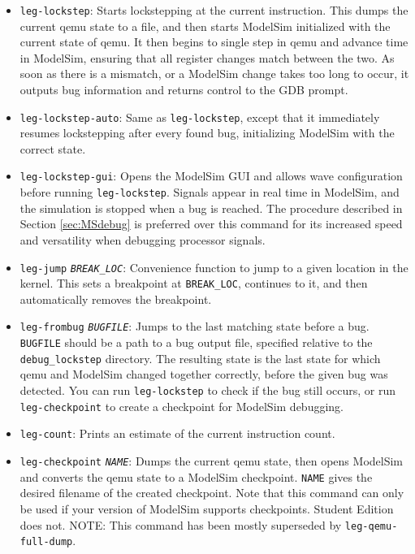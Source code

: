 \begin{itemize}
\item \texttt{leg-lockstep}: Starts lockstepping at the current instruction. This dumps the current qemu state to a file, and then starts ModelSim initialized with the current state of qemu. It then begins to single step in qemu and advance time in ModelSim, ensuring that all register changes match between the two. As soon as there is a mismatch, or a ModelSim change takes too long to occur, it outputs bug information and returns control to the GDB prompt.

\item \texttt{leg-lockstep-auto}: Same as \texttt{leg-lockstep}, except that it immediately resumes lockstepping after every found bug, initializing ModelSim with the correct state.

\item \texttt{leg-lockstep-gui}: Opens the ModelSim GUI and allows wave configuration before running \texttt{leg-lockstep}.
Signals appear in real time in ModelSim, and the simulation is stopped when a bug is reached. 
The procedure described in Section \ref{sec:MSdebug} is preferred over this command for its increased speed and versatility when debugging processor signals.

\item \texttt{leg-jump} \texttt{\emph{BREAK\_LOC}}: Convenience function to jump to a given location in the kernel. This sets a breakpoint at \texttt{BREAK\_LOC}, continues to it, and then automatically removes the breakpoint.

\item \texttt{leg-frombug} \texttt{\emph{BUGFILE}}: Jumps to the last matching state before a bug. \texttt{BUGFILE} should be a path to a bug output file, specified relative to the \texttt{debug\_lockstep} directory. The resulting state is the last state for which qemu and ModelSim changed together correctly, before the given bug was detected. You can run \texttt{leg-lockstep} to check if the bug still occurs, or run \texttt{leg-checkpoint} to create a checkpoint for ModelSim debugging.

\item \texttt{leg-count}: Prints an estimate of the current instruction count.

\item \texttt{leg-checkpoint} \texttt{\emph{NAME}}: Dumps the current qemu state, then opens ModelSim and converts the qemu state to a ModelSim checkpoint. \texttt{NAME} gives the desired filename of the created checkpoint. Note that this command can only be used if your version of ModelSim supports checkpoints. Student Edition does not.
NOTE: This command has been mostly superseded by \texttt{leg-qemu-full-dump}.


\end{itemize}
